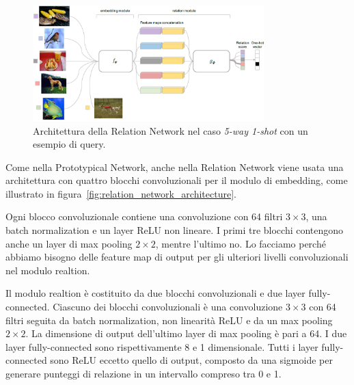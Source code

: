\documentclass[12pt,a4paper,titlepage]{article}
\begin{document}
\begin{figure}[h]
	\centering	
	\includegraphics[width=0.8\textwidth]{Immagini/relation_network}
	\caption{Architettura della Relation Network nel caso \textit{5-way 1-shot} con un esempio di query.~\cite{sung:relation}}
	\label{fig:relation_network}
\end{figure}

Come nella Prototypical Network, anche nella Relation Network viene usata una architettura con quattro blocchi convoluzionali per il modulo di embedding, come illustrato in figura~\ref{fig:relation_network_architecture}.

Ogni blocco convoluzionale contiene una convoluzione con 64 filtri $3 \times 3$, una batch normalization e un layer ReLU non lineare. I primi tre blocchi contengono anche un layer di max pooling $2 \times 2$, mentre l'ultimo no. Lo facciamo perché abbiamo bisogno delle feature map di output per gli ulteriori livelli convoluzionali nel modulo realtion. 

Il modulo realtion è costituito da due blocchi convoluzionali e due layer fully-connected. Ciascuno dei blocchi convoluzionali è una convoluzione $3 \times 3$ con 64 filtri seguita da batch normalization, non linearità ReLU e da un max pooling $2 \times 2$. La dimensione di output dell'ultimo layer di max pooling è pari a 64. I due layer fully-connected sono rispettivamente 8 e 1 dimensionale. Tutti i layer fully-connected sono ReLU eccetto quello di output, composto da una sigmoide per generare punteggi di relazione in un intervallo compreso tra 0 e 1.
\end{document}

